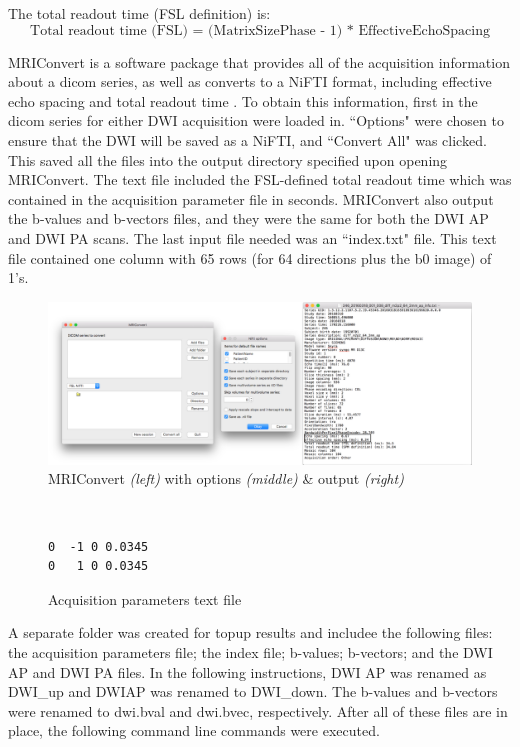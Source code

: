 The total readout time (FSL definition) is:
\[
\text{Total readout time (FSL) = (MatrixSizePhase - 1) * EffectiveEchoSpacing}
\]

MRIConvert is a software package that provides all of the acquisition information about a dicom series, as well as converts to a NiFTI format, including effective echo spacing and total readout time \cite{ref:mriconvert}. To obtain this information, first in the dicom series for either DWI acquisition were loaded in. ``Options" were chosen to ensure that the DWI will be saved as a NiFTI, and ``Convert All" was clicked. This saved all the files into the output directory specified upon opening MRIConvert. The text file included the FSL-defined total readout time which was contained in the acquisition parameter file in seconds. MRIConvert also output the b-values and b-vectors files, and they were the same for both the DWI AP and DWI PA scans. The last input file needed was an ``index.txt" file. This text file contained one column with 65 rows (for 64 directions plus the b0 image) of 1's.

\begin{figure}[H]
    \centering
    \includegraphics[width=\textwidth]{Figures/combined}
    \caption{MRIConvert \textit{(left)} with options \textit{(middle)} \& output \textit{(right)} }
    \label{fig:mri_convert}
\end{figure}

\begin{figure}[H]
\centering
{\tt
\begin{varwidth}{\linewidth}
\begin{verbatim}
0  -1 0 0.0345
0   1 0 0.0345
\end{verbatim}
\end{varwidth}
}
\label{fig:acq}
\caption{Acquisition parameters text file}
\end{figure}

A separate folder was created for topup results and includee the following files: the acquisition parameters file; the index file; b-values; b-vectors; and the DWI AP and DWI PA files. In the following instructions, DWI AP was renamed as DWI\_up and DWIAP was renamed to DWI\_down. The b-values and b-vectors were renamed to dwi.bval and dwi.bvec, respectively. After all of these files are in place, the following command line commands were executed.

